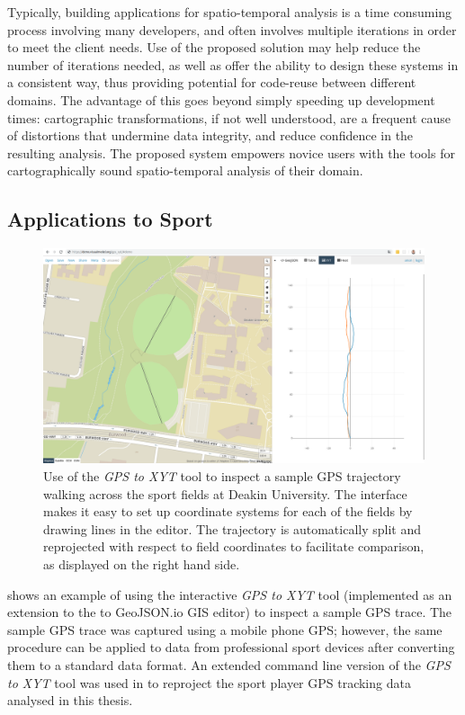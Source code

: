 Typically, building applications for spatio-temporal analysis is a time
consuming process involving many developers, and often involves multiple
iterations in order to meet the client needs. Use of the proposed solution may help
reduce the number of iterations needed, as well as offer the ability to
design these systems in a consistent way, thus providing potential for
code-reuse between different domains. The advantage of this goes beyond
simply speeding up development times: cartographic transformations, if
not well understood, are a frequent cause of distortions that undermine
data integrity, and reduce confidence in the resulting analysis. The proposed
system empowers novice users with the tools for cartographically sound
spatio-temporal analysis of their domain.

\subsection*{Applications to Sport}

\begin{figure}
\includegraphics[width=1.0\linewidth]{figs/screenshot-xyt-demo-vismodel.png}
\caption{Use of the \textit{GPS to XYT} tool to inspect a sample GPS trajectory walking across the sport fields at Deakin University. The interface makes it easy to set up coordinate systems for each of the fields by drawing lines in the editor. The trajectory is automatically split and reprojected with respect to field coordinates to facilitate comparison, as displayed on the right hand side.}
\label{fig:xyt-demo-vismodel}
\end{figure}

 shows an example of using the interactive \textit{GPS to XYT} tool (implemented as an extension to the to GeoJSON.io GIS editor) to inspect a sample GPS trace. The sample GPS trace was captured using a mobile phone GPS; however, the same procedure can be applied to data from professional sport devices after converting them to a standard data format. An extended command line version of the \textit{GPS to XYT} tool was used in  to reproject the sport player GPS tracking data analysed in this thesis.

